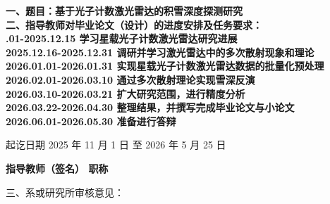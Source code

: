 \cleardoublepage{}

{
    \bfseries
    \noindent 一、题目：基于光子计数激光雷达的积雪深度探测研究\\
    \noindent 二、指导教师对毕业论文（设计）的进度安排及任务要求：\\
    {.01-2025.12.15 学习星载光子计数激光雷达研究进展 \\
    2025.12.16-2025.12.31 调研并学习激光雷达中的多次散射现象和理论 \\
    2026.01.01-2026.01.31 实现星载光子计数激光雷达数据的批量化预处理 \\
    2026.02.01-2026.03.10 通过多次散射理论实现雪深反演 \\
    2026.03.10-2026.03.21 扩大研究范围，进行精度分析 \\
    2026.03.22-2026.04.30 整理结果，并撰写完成毕业论文与小论文 \\
    2026.06.01-2026.05.30 准备进行答辩}
    \vskip 50mm

    \noindent 起讫日期 2025 年 11 月 1 日 至 2026 年 5 月 25 日
    \begin{flushright}
        \bfseries {}
            指导教师（签名） \underline{} 职称 \underline{}
    \end{flushright}

    \noindent 三、系或研究所审核意见：\\

    \mbox{} \vfill
    \signature{负责人（签名）}
}

